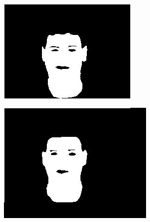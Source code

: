 \begin{figure}[h]
\begin{subfigure}[b]{0.18\textwidth}
         \caption{}
     \end{subfigure}
     \hfill
     \begin{subfigure}[b]{0.18\textwidth}
         \centering
         \includegraphics[width=\textwidth]{images/results/base_st/m-022-5.color.d3_y.png}
         \caption{}
     \end{subfigure}
    \hfill
     \begin{subfigure}[b]{0.18\textwidth}
         \centering
         \includegraphics[width=\textwidth]{images/results/base_st/m-022-5.color.d3_skinny_25.png}
         \caption{}
     \end{subfigure}
    \hfill
     \begin{subfigure}[b]{0.18\textwidth}

\end{subfigure}
\end{figure}

